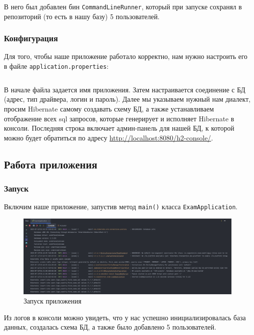 \documentclass[a4paper, 14pt]{article}
\begin{document}
В него был добавлен бин \texttt{CommandLineRunner}, который при запуске сохранял в репозиторий (то есть в нашу базу) 5 пользователей.

\subsubsection{Конфигурация}

Для того, чтобы наше приложение работало корректно, нам нужно настроить его в файле \texttt{application.properties}:

\normalsize
\inputminted[frame=single]{properties}{../src/main/resources/application.properties}
\large

В начале файла задается имя приложения. Затем настраивается соединение с БД (адрес, тип драйвера, логин и пароль). Далее мы указываем нужный нам диалект, просим Hibernate самому создавать схему БД, а также устанавливаем отображение всех sql запросов, которые генерирует и исполняет Hibernate в консоли. Последняя строка включает админ-панель для нашей БД, к которой можно будет обратиться по адресу \url{http://localhost:8080/h2-console/}.

\subsection{Работа приложения}

\subsubsection{Запуск}

Включим наше приложение, запустив метод \texttt{main()} класса \texttt{ExamApplication}.

\begin{figure}[H]
	\centering
	\includegraphics[width=15cm]{resources/2.png}
	\caption{Запуск приложения}
\end{figure}

Из логов в консоли можно увидеть, что у нас успешно инициализировалась база данных, создалась схема БД, а также было добавлено 5 пользователей.
\end{document}
